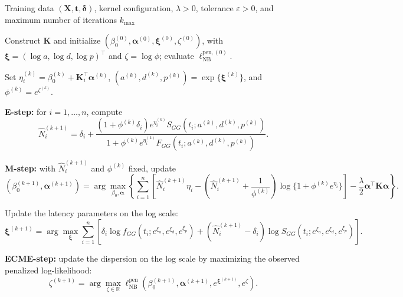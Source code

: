 \begin{algorithm*}[tbp]
	\caption{Penalized ECME algorithm for the negative-binomial GG-KM model}
	\label{alg:nb-ecme}
	\begin{algorithmic}[1]

		\Require Training data $(\bm X,\bm t,\bm\delta)$, kernel configuration,
		$\lambda>0$, tolerance $\varepsilon>0$, and maximum number of
		iterations $k_{\max}$

		\State Construct $\bm K$ and initialize
		$(\beta_0^{(0)},\bm\alpha^{(0)},\bm\xi^{(0)},\zeta^{(0)})$, with
		$\bm\xi=(\log a,\log d,\log p)^\top$ and $\zeta=\log\phi$;
		evaluate $\ell_{\mathrm{NB}}^{\mathrm{pen},(0)}$.


			\State Set
			$\eta_i^{(k)}
			=\beta_0^{(k)}+\bm K_i^\top\bm\alpha^{(k)}$,
			$(a^{(k)},d^{(k)},p^{(k)})=\exp\{\bm\xi^{(k)}\}$, and
			$\phi^{(k)}=e^{\zeta^{(k)}}$.

			\State \textbf{E-step:} for $i=1,\ldots,n$, compute
			\[
			\widehat N_i^{(k+1)}
			=
			\delta_i+
			\frac{
				(1+\phi^{(k)}\delta_i)
				e^{\eta_i^{(k)}}
				S_{GG}(t_i;a^{(k)},d^{(k)},p^{(k)})
			}{
				1+\phi^{(k)}
				e^{\eta_i^{(k)}}
				F_{GG}(t_i;a^{(k)},d^{(k)},p^{(k)})
			}.
			\]

			\State \textbf{M-step:} with $\widehat N_i^{(k+1)}$ and
			$\phi^{(k)}$ fixed, update
			\[
			(\beta_0^{(k+1)},\bm\alpha^{(k+1)})
			=
			\arg\max_{\beta_0,\bm\alpha}
			\left\{
			\sum_{i=1}^{n}
			\left[
				\widehat N_i^{(k+1)}\eta_i
				-
				\left(
					\widehat N_i^{(k+1)}
					+\frac{1}{\phi^{(k)}}
				\right)
				\log\{1+\phi^{(k)}e^{\eta_i}\}
			\right]
			-
			\frac{\lambda}{2}
			\bm\alpha^\top\bm K\bm\alpha
			\right\}.
			\]

			\State Update the latency parameters on the log scale:
			\[
			\bm\xi^{(k+1)}
			=
			\arg\max_{\bm\xi}
			\sum_{i=1}^{n}
			\left[
				\delta_i
				\log f_{GG}(t_i;e^{\xi_a},e^{\xi_d},e^{\xi_p})
				+
				(\widehat N_i^{(k+1)}-\delta_i)
				\log S_{GG}(t_i;e^{\xi_a},e^{\xi_d},e^{\xi_p})
			\right].
			\]

			\State \textbf{ECME-step:} update the dispersion on the log scale
			by maximizing the observed penalized log-likelihood:
			\[
			\zeta^{(k+1)}
			=
			\arg\max_{\zeta\in\mathbb R}
			\ell_{\mathrm{NB}}^{\mathrm{pen}}
			\left(
			    \beta_0^{(k+1)},
			    \bm\alpha^{(k+1)},
			    e^{\bm\xi^{(k+1)}},
			    e^\zeta
			\right).
			\]


\end{algorithmic}
\end{algorithm*}
